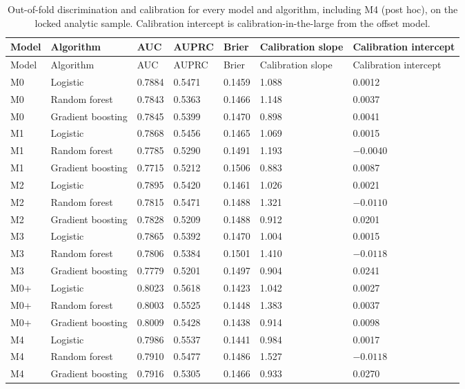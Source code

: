 \documentclass[11pt]{article}
\begin{document}
\begin{longtable}{L{1.4cm}L{3.2cm}R{1.6cm}R{1.6cm}R{1.6cm}R{2.0cm}R{2.4cm}}
\caption{Out-of-fold discrimination and calibration for every model and algorithm, including M4 (post hoc), on the locked analytic sample. Calibration intercept is calibration-in-the-large from the offset model.}\\
\toprule
Model & Algorithm & AUC & AUPRC & Brier & Calibration slope & Calibration intercept \\
\midrule
\endfirsthead
\toprule
Model & Algorithm & AUC & AUPRC & Brier & Calibration slope & Calibration intercept \\
\midrule
\endhead
\bottomrule
\endlastfoot
M0 & Logistic & 0.7884 & 0.5471 & 0.1459 & 1.088 & 0.0012 \\
M0 & Random forest & 0.7843 & 0.5363 & 0.1466 & 1.148 & 0.0037 \\
M0 & Gradient boosting & 0.7845 & 0.5399 & 0.1470 & 0.898 & 0.0041 \\
M1 & Logistic & 0.7868 & 0.5456 & 0.1465 & 1.069 & 0.0015 \\
M1 & Random forest & 0.7785 & 0.5290 & 0.1491 & 1.193 & $-0.0040$ \\
M1 & Gradient boosting & 0.7715 & 0.5212 & 0.1506 & 0.883 & 0.0087 \\
M2 & Logistic & 0.7895 & 0.5420 & 0.1461 & 1.026 & 0.0021 \\
M2 & Random forest & 0.7815 & 0.5471 & 0.1488 & 1.321 & $-0.0110$ \\
M2 & Gradient boosting & 0.7828 & 0.5209 & 0.1488 & 0.912 & 0.0201 \\
M3 & Logistic & 0.7865 & 0.5392 & 0.1470 & 1.004 & 0.0015 \\
M3 & Random forest & 0.7806 & 0.5384 & 0.1501 & 1.410 & $-0.0118$ \\
M3 & Gradient boosting & 0.7779 & 0.5201 & 0.1497 & 0.904 & 0.0241 \\
M0+ & Logistic & 0.8023 & 0.5618 & 0.1423 & 1.042 & 0.0027 \\
M0+ & Random forest & 0.8003 & 0.5525 & 0.1448 & 1.383 & 0.0037 \\
M0+ & Gradient boosting & 0.8009 & 0.5428 & 0.1438 & 0.914 & 0.0098 \\
M4 & Logistic & 0.7986 & 0.5537 & 0.1441 & 0.984 & 0.0017 \\
M4 & Random forest & 0.7910 & 0.5477 & 0.1486 & 1.527 & $-0.0118$ \\
M4 & Gradient boosting & 0.7916 & 0.5305 & 0.1466 & 0.933 & 0.0270 \\
\end{longtable}
\end{document}
